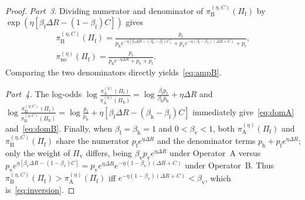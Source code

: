 \documentclass[11pt,a4paper]{article}
\begin{document}
\begin{proof}
\emph{Part~3.} Dividing numerator and denominator of $\pi_{\mathrm{B}}^{(\eta, C)}(\Pi_{\mathrm{f}})$ by $\exp(\eta[\beta_{\mathrm{f}}\Delta R - (1-\beta_{\mathrm{f}})C])$ gives
\begin{gather*}
  \pi_{\mathrm{B}}^{(\eta, C)}(\Pi_{\mathrm{f}})
  = \frac{p_{\mathrm{f}}}{p_{\mathrm{h}} e^{-\eta[\beta_{\mathrm{f}}\Delta R - (\beta_{\mathrm{h}}-\beta_{\mathrm{f}})C]} + p_{\mathrm{v}} e^{-\eta(\beta_{\mathrm{f}}-\beta_{\mathrm{v}})(\Delta R + C)} + p_{\mathrm{f}}},\\
  \pi_{\mathrm{no}}^{(\eta)}(\Pi_{\mathrm{f}})
  = \frac{p_{\mathrm{f}}}{p_{\mathrm{h}} e^{-\eta \Delta R} + p_{\mathrm{v}} + p_{\mathrm{f}}}.
\end{gather*}
Comparing the two denominators directly yields~\eqref{eq:ampB}.

\emph{Part~4.} The log-odds $\log\frac{\pi_{\mathrm{A}}^{(\eta)}(\Pi_{\mathrm{f}})}{\pi_{\mathrm{A}}^{(\eta)}(\Pi_{\mathrm{h}})} = \log\frac{\beta_{\mathrm{f}} p_{\mathrm{f}}}{\beta_{\mathrm{h}} p_{\mathrm{h}}} + \eta\Delta R$ and $\log\frac{\pi_{\mathrm{B}}^{(\eta, C)}(\Pi_{\mathrm{f}})}{\pi_{\mathrm{B}}^{(\eta, C)}(\Pi_{\mathrm{h}})} = \log\frac{p_{\mathrm{f}}}{p_{\mathrm{h}}} + \eta[\beta_{\mathrm{f}}\Delta R - (\beta_{\mathrm{h}} - \beta_{\mathrm{f}})C]$ immediately give~\eqref{eq:domA} and~\eqref{eq:domB}. Finally, when $\beta_{\mathrm{f}} = \beta_{\mathrm{h}} = 1$ and $0 < \beta_{\mathrm{v}} < 1$, both $\pi_{\mathrm{A}}^{(\eta)}(\Pi_{\mathrm{f}})$ and $\pi_{\mathrm{B}}^{(\eta, C)}(\Pi_{\mathrm{f}})$ share the numerator $p_{\mathrm{f}} e^{\eta \Delta R}$ and the denominator terms $p_{\mathrm{h}} + p_{\mathrm{f}} e^{\eta \Delta R}$; only the weight of $\Pi_{\mathrm{v}}$ differs, being $\beta_{\mathrm{v}} p_{\mathrm{v}} e^{\eta \Delta R}$ under Operator~A versus $p_{\mathrm{v}} e^{\eta[\beta_{\mathrm{v}}\Delta R - (1-\beta_{\mathrm{v}})C]} = p_{\mathrm{v}} e^{\eta \Delta R} e^{-\eta(1-\beta_{\mathrm{v}})(\Delta R + C)}$ under Operator~B. Thus $\pi_{\mathrm{B}}^{(\eta, C)}(\Pi_{\mathrm{f}}) > \pi_{\mathrm{A}}^{(\eta)}(\Pi_{\mathrm{f}})$ iff $e^{-\eta(1-\beta_{\mathrm{v}})(\Delta R + C)} < \beta_{\mathrm{v}}$, which is~\eqref{eq:inversion}.
\end{proof}
\end{document}
